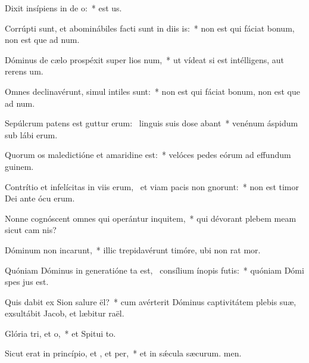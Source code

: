 \item Dixit insípiens in de o:~*  est us.
\item Corrúpti sunt, et abominábiles facti sunt in diis is:~* non est qui fáciat bonum, non est que ad num.
\item Dóminus de cælo prospéxit super lios num,~* ut vídeat si est intélligens, aut rerens um.
\item Omnes declinavérunt, simul intiles  sunt:~* non est qui fáciat bonum, non est que ad num.
\item Sepúlcrum patens est guttur erum:~\pscross{} linguis suis dose abant~* venénum áspidum sub lábi erum.
\item Quorum os maledictióne et amaridine  est:~* velóces pedes eórum ad effundum guinem.
\item Contrítio et infelícitas in viis erum,~\pscross{} et viam pacis non gnorunt:~* non est timor Dei ante ócu erum.
\item Nonne cognóscent omnes qui operántur inquitem,~* qui dévorant plebem meam sicut cam nis?
\item Dóminum non incarunt,~* illic trepidavérunt timóre, ubi non rat mor.
\item Quóniam Dóminus in generatióne ta est,~\pscross{} consílium ínopis futis:~* quóniam Dómi spes jus est.
\item Quis dabit ex Sion salure ël?~* cum avérterit Dóminus captivitátem plebis suæ, exsultábit Jacob, et læbitur raël.
\item Glória tri, et o,~* et Spitui to.
\item Sicut erat in princípio, et , et per,~* et in sǽcula sæcurum. men.
